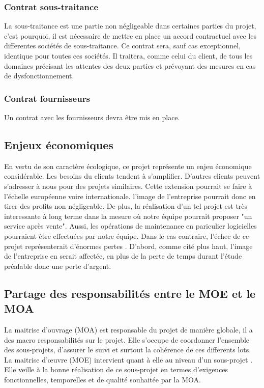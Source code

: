 \subsubsection{Contrat sous-traitance}
La sous-traitance est une partie non négligeable dans certaines parties du projet, c'est pourquoi, il est nécessaire de mettre en place un accord
contractuel avec les differentes sociétés de sous-traitance. Ce contrat sera, sauf cas exceptionnel, identique pour toutes ces sociétés.
Il traitera, comme celui du client, de tous les domaines précisant les attentes des deux parties et prévoyant des mesures en cas de dysfonctionnement.
\subsubsection{Contrat fournisseurs}
Un contrat avec les fournisseurs devra être mis en place.
\subsection{Enjeux économiques}
En vertu de son caractère écologique, ce projet représente un enjeu économique considérable. Les besoins du clients tendent à s'amplifier. D'autres
clients peuvent s'adresser à nous pour des projets similaires. Cette extension pourrait se faire à l'échelle européenne voire internationale.
l'image de l'entreprise pourrait donc en tirer des profits non négligeable.
De plus, la réalisation d'un tel projet est très interessante à long terme dans la mesure où notre équipe pourrait proposer "un service après vente".
Aussi, les opérations de maintenance en pariculier logicielles pourraient être effectuées par notre équipe.
Dans le cas contraire, l'échec de ce projet représenterait d'énormes pertes . D'abord, comme cité plus haut, l'image de l'entreprise en serait affectée,
en plus de la perte de temps durant l'étude préalable donc une perte d'argent.

\subsection{Partage des responsabilités entre le MOE et le MOA}

La maitrise d’ouvrage (MOA) est responsable du projet de manière globale, il a des macro responsabilités sur le projet.
Elle s'occupe de coordonner l'ensemble des sous-projets, d'assurer le suivi et surtout la cohérence de ces differents lots.\\
La maitrise d’œuvre (MOE) intervient quant à elle au niveau d’un sous-projet . Elle veille à la bonne réalisation de ce sous-projet en termes d'exigences
fonctionnelles, temporelles et de qualité souhaitée par la MOA.

